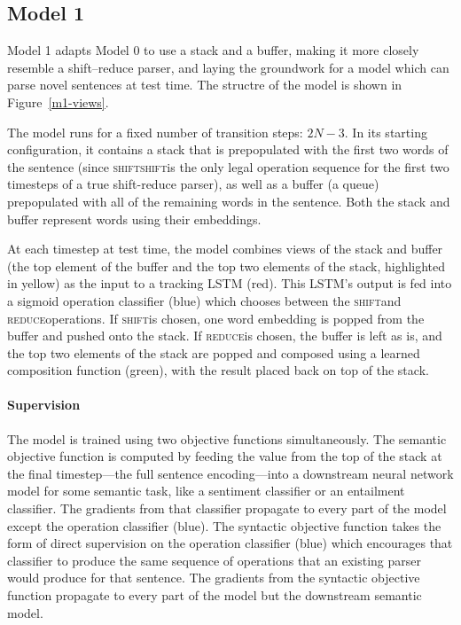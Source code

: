 \documentclass[11pt,letterpaper]{article}
\newcommand{\shift}{\textsc{shift}}
\newcommand{\reduce}{\textsc{reduce}}
\begin{document}
\subsection{Model 1}



Model 1 adapts Model 0 to use a stack and a buffer, making it more closely resemble a shift--reduce parser, and laying the groundwork for a model which can parse novel sentences at test time. The structre of the model is shown in Figure~\ref{m1-views}.

The model runs for a fixed number of transition steps: $2N - 3$. In its starting configuration, it contains a stack that is prepopulated with the first two words of the sentence (since \shift \shift is the only legal operation sequence for the first two timesteps of a true shift-reduce parser), as well as a buffer (a queue) prepopulated with all of the remaining words in the sentence. Both the stack and buffer represent words using their embeddings. 

At each timestep at test time, the model combines views of the stack and buffer (the top element of the buffer and the top two elements of the stack, highlighted in yellow) as the input to a tracking LSTM (red). This LSTM's output is fed into a sigmoid operation classifier (blue) which chooses between the \shift and \reduce operations. If \shift is chosen, one word embedding is popped from the buffer and pushed onto the stack. If \reduce is chosen, the buffer is left as is, and the top two elements of the stack are popped and composed using a learned composition function (green), with the result placed back on top of the stack.

\paragraph{Supervision} The model is trained using two objective functions simultaneously. The semantic objective function is computed by feeding the value from the top of the stack at the final timestep---the full sentence encoding---into a downstream neural network model for some semantic task, like a sentiment classifier or an entailment classifier. The gradients from that classifier propagate to every part of the model except the operation classifier (blue). The syntactic objective function takes the form of direct supervision on the operation classifier (blue) which encourages that classifier to produce the same sequence of operations that an existing parser would produce for that sentence. The gradients from the syntactic objective function propagate to every part of the model but the downstream semantic model.
\end{document}
